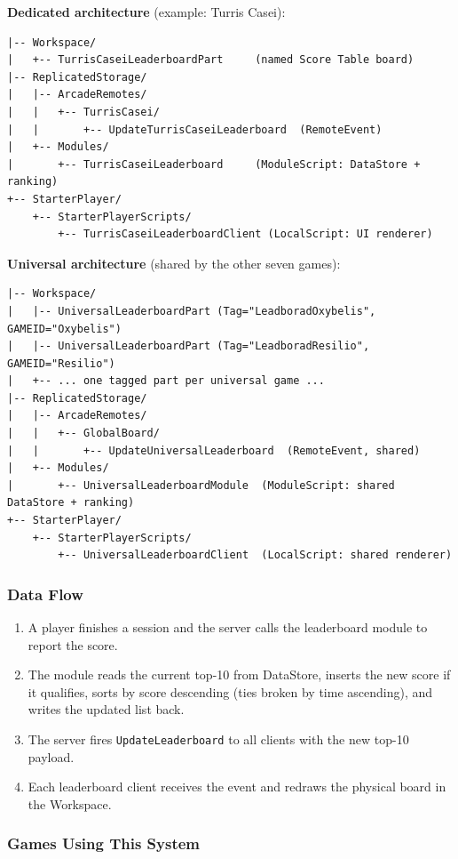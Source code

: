 \documentclass[12pt,letterpaper]{article}
\begin{document}
\textbf{Dedicated architecture} (example: Turris Casei):
\begin{lstlisting}
|-- Workspace/
|   +-- TurrisCaseiLeaderboardPart     (named Score Table board)
|-- ReplicatedStorage/
|   |-- ArcadeRemotes/
|   |   +-- TurrisCasei/
|   |       +-- UpdateTurrisCaseiLeaderboard  (RemoteEvent)
|   +-- Modules/
|       +-- TurrisCaseiLeaderboard     (ModuleScript: DataStore + ranking)
+-- StarterPlayer/
    +-- StarterPlayerScripts/
        +-- TurrisCaseiLeaderboardClient (LocalScript: UI renderer)
\end{lstlisting}

\textbf{Universal architecture} (shared by the other seven games):
\begin{lstlisting}
|-- Workspace/
|   |-- UniversalLeaderboardPart (Tag="LeadboradOxybelis", GAMEID="Oxybelis")
|   |-- UniversalLeaderboardPart (Tag="LeadboradResilio",  GAMEID="Resilio")
|   +-- ... one tagged part per universal game ...
|-- ReplicatedStorage/
|   |-- ArcadeRemotes/
|   |   +-- GlobalBoard/
|   |       +-- UpdateUniversalLeaderboard  (RemoteEvent, shared)
|   +-- Modules/
|       +-- UniversalLeaderboardModule  (ModuleScript: shared DataStore + ranking)
+-- StarterPlayer/
    +-- StarterPlayerScripts/
        +-- UniversalLeaderboardClient  (LocalScript: shared renderer)
\end{lstlisting}

\subsubsection{Data Flow}

\begin{enumerate}
  \item A player finishes a session and the server calls the leaderboard module to report the score.
  \item The module reads the current top-10 from DataStore, inserts the new score if it qualifies, sorts by score descending (ties broken by time ascending), and writes the updated list back.
  \item The server fires \texttt{UpdateLeaderboard} to all clients with the new top-10 payload.
  \item Each leaderboard client receives the event and redraws the physical board in the Workspace.
\end{enumerate}

\subsubsection{Games Using This System}
\end{document}
